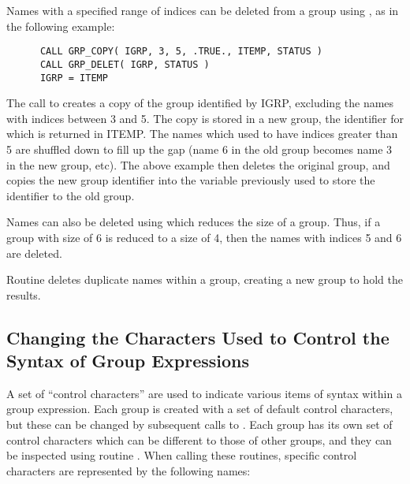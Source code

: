 Names with a specified range of indices can be deleted from a group using
, as in the following example:

\small
\begin{verbatim}
      CALL GRP_COPY( IGRP, 3, 5, .TRUE., ITEMP, STATUS )
      CALL GRP_DELET( IGRP, STATUS )
      IGRP = ITEMP
\end{verbatim}
\normalsize

The call to  creates a copy of the group identified by IGRP,
excluding the names with indices between 3 and 5. The copy is stored in a new
group, the identifier for which is returned in ITEMP. The names which used to
have indices greater than 5 are shuffled down to fill up the gap (name 6 in
the old group becomes name 3 in the new group, etc). The above example then
deletes the original group, and copies the new group identifier into the
variable previously used to store the identifier to the old group.

Names can also be deleted using  which reduces the size of a group.
Thus, if a group with size of 6 is reduced to a size of 4, then the names with
indices 5 and 6 are deleted.

Routine  deletes duplicate names within a group, creating a new group
to hold the results.

\subsection{\label{SEC:CC}Changing the Characters Used to Control the Syntax of Group
Expressions}

A set of ``control characters'' are used to indicate various items of
syntax within
a group expression. Each group is created with a set of default control
characters, but these can be changed by subsequent calls to . Each
group has its own set of control characters which can be different to those of
other groups, and they can be inspected using routine
. When calling
these routines, specific control characters are represented by the following
names:

